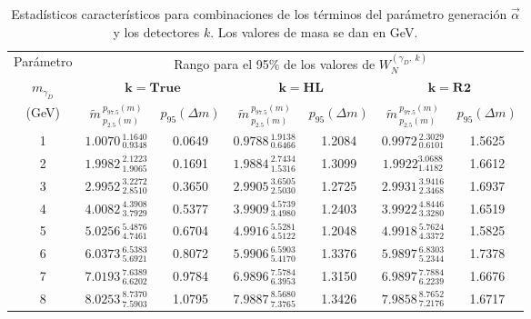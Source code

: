 \begin{table}[!t]
\centering
\footnotesize%
\begin{tabular}{|c|cc|cc|cc|}
\toprule
Parámetro& \multicolumn{6}{c|}{Rango para el 95\% de los valores de $W_N^{(\gamma_D, ~ k)}$ }\\
$m_{\gamma_D}$ & \multicolumn{2}{c}{$\mathbf{k = True}$} & \multicolumn{2}{c}{$\mathbf{k = HL}$} & \multicolumn{2}{c|}{$\mathbf{k = R2}$}\\
(GeV)
& $\widetilde{m}^{~p_{97.5}(m)}_{~p_{2.5}{(m)}}$ & $p_{95}{(\Delta m)}$
& $\widetilde{m}^{~p_{97.5}{(m)}}_{~p_{2.5}{(m)}}$ & $p_{95}{(\Delta m)}$ 
& $\widetilde{m}^{~p_{97.5}{(m)}}_{~p_{2.5}{(m)}}$ & $p_{95}{(\Delta m)}$ \\
\midrule
1 & $1.0070^{~1.1640}_{~0.9348}$ & 0.0649 & $0.9788^{~1.9138}_{~0.6466}$ & 1.2084 & $0.9972^{~2.3029}_{~0.6101}$ & 1.5625 \\ \midrule
2 & $1.9982^{~2.1223}_{~1.9065}$ & 0.1691 & $1.9884^{~2.7434}_{~1.5316}$ & 1.3099 & $1.9922^{3.0688}_{1.4182}$ & 1.6612\\ \midrule
3 & $2.9952^{~3.2272}_{~2.8510}$ & 0.3650 & $2.9905^{~3.6505}_{~2.5030}$ & 1.2725 & $2.9931^{~3.9416}_{~2.3468}$ & 1.6937\\ \midrule
4 & $4.0082^{~4.3908}_{~3.7929}$ & 0.5377 & $3.9909^{~4.5739}_{~3.4980}$ & 1.2403 & $3.9922^{~4.8446}_{~3.3280}$ & 1.6519\\ \midrule
5 & $5.0256^{~5.4876}_{~4.7461}$ & 0.6704 & $4.9916^{~5.5281}_{~4.5122}$ & 1.2048 & $4.9918^{~5.7624}_{~4.3372}$ & 1.5825 \\ \midrule
6 & $6.0373^{~6.5383}_{~5.6921}$ & 0.8072 & $5.9906^{~6.5903}_{~5.4170}$ & 1.3376 & $5.9897^{~6.8303}_{~5.2344}$ & 1.7378\\ \midrule
7 & $7.0193^{~7.6389}_{~6.6202}$ & 0.9784 & $6.9896^{~7.5784}_{~6.3953}$ & 1.3150 & $6.9897^{~7.7884}_{~6.2239}$ & 1.6676\\ \midrule
8 & $8.0253^{~8.7370}_{~7.5903}$ & 1.0795 & $7.9887^{~8.5680}_{~7.3765}$ & 1.3426 & $7.9858^{~8.7652}_{~7.2176}$ & 1.6717\\
\bottomrule 
\end{tabular}
\caption{Estadísticos característicos para combinaciones de los términos del parámetro generación $\vec{\alpha}$ y los detectores $k$. Los valores de masa se dan en GeV.}
\label{mass0}
\end{table}

